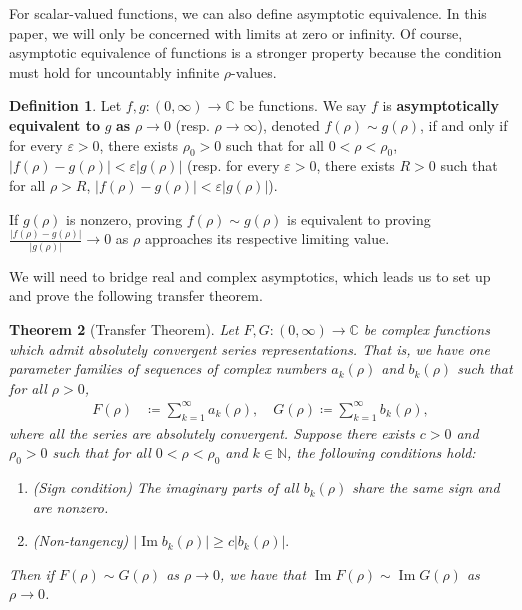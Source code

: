 \documentclass{amsart}
\theoremstyle{plain}
\newtheorem{theorem}{Theorem}
\numberwithin{theorem}{section}
\DeclareMathOperator{\Imz}{Im}
\theoremstyle{definition}
\newtheorem{definition}[theorem]{Definition}
\theoremstyle{remark}
\theoremstyle{brakets}
\newcommand{\C}{\mathbb{C}}
\newcommand{\N}{\mathbb{N}}
\newcommand{\vep}{\varepsilon}
\begin{document}
For scalar-valued functions, we can also define asymptotic equivalence. In this paper, we will only be concerned with limits at zero or infinity. Of course, asymptotic equivalence of functions is a stronger property because the condition must hold for uncountably infinite $\rho$-values.

\begin{definition}
    Let $f,g: (0,\infty) \to \C$ be functions. We say $f$ is \textbf{asymptotically equivalent to} $g$ \textbf{as} $\rho \to 0$ (resp. $\rho \to \infty$), denoted $f(\rho) \sim g(\rho)$, if and only if for every $\vep > 0$, there exists $\rho_0 > 0$ such that for all $0 < \rho < \rho_0$, $|f(\rho)-g(\rho)| < \vep |g(\rho)|$ (resp. for every $\vep > 0$, there exists $R > 0$ such that for all $\rho > R$, $|f(\rho) - g(\rho)| < \vep |g(\rho)|$).
\end{definition}
If $g(\rho)$ is nonzero, proving $f(\rho) \sim g(\rho)$ is equivalent to proving $\frac{|f(\rho) - g(\rho)|}{|g(\rho)|} \to 0$ as $\rho$ approaches its respective limiting value.

We will need to bridge real and complex asymptotics, which leads us to set up and prove the following transfer theorem.

\begin{theorem}[Transfer Theorem] \label{transferthm}
    Let $F,G: (0,\infty) \to \C$ be complex functions which admit absolutely convergent series representations. That is, we have one parameter families of sequences of complex numbers $a_k(\rho)$ and $b_k(\rho)$ such that for all $\rho > 0$,
     \begin{align*}
    F(\rho) &\coloneq \sum_{k=1}^{\infty} a_k(\rho), \quad
    G(\rho) \coloneq \sum_{k=1}^{\infty} b_k(\rho),
\end{align*}
where all the series are absolutely convergent. Suppose there exists $c>0$ and $\rho_0 > 0$ such that for all $0 < \rho < \rho_0$ and $k \in \N$, the following conditions hold:
\begin{enumerate}
    \item (Sign condition) The imaginary parts of all $b_k(\rho)$ share the same sign and are nonzero.
    \item (Non-tangency) $\left| \Imz b_k(\rho) \right| \geq c|b_k(\rho)|.$
\end{enumerate}
Then if $F(\rho) \sim G(\rho)$ as $\rho \to 0$, we have that $\Imz F(\rho) \sim \Imz G(\rho)$ as $\rho \to 0$.
\end{theorem}
\end{document}
